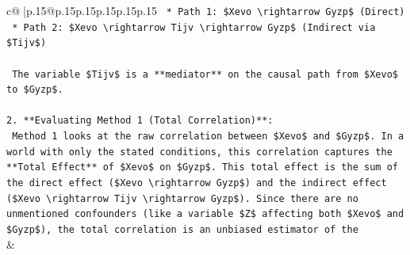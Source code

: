 \documentclass{article}
\begin{document}
{\begin{supertabular}{c@{$\;$}|p{.15\linewidth}@{}p{.15\linewidth}p{.15\linewidth}p{.15\linewidth}p{.15\linewidth}p{.15\linewidth}}
{{{\texttt{    *   Path 1: \$Xevo \textbackslash{}rightarrow Gyzp\$ (Direct)} \\
\texttt{    *   Path 2: \$Xevo \textbackslash{}rightarrow Tijv \textbackslash{}rightarrow Gyzp\$ (Indirect via \$Tijv\$)} \\
\\ 
\texttt{    The variable \$Tijv\$ is a **mediator** on the causal path from \$Xevo\$ to \$Gyzp\$.} \\
\\ 
\texttt{2.  **Evaluating Method 1 (Total Correlation)**:} \\
\texttt{    Method 1 looks at the raw correlation between \$Xevo\$ and \$Gyzp\$. In a world with only the stated conditions, this correlation captures the **Total Effect** of \$Xevo\$ on \$Gyzp\$. This total effect is the sum of the direct effect (\$Xevo \textbackslash{}rightarrow Gyzp\$) and the indirect effect (\$Xevo \textbackslash{}rightarrow Tijv \textbackslash{}rightarrow Gyzp\$). Since there are no unmentioned confounders (like a variable \$Z\$ affecting both \$Xevo\$ and \$Gyzp\$), the total correlation is an unbiased estimator of the} \\
            }
        }
    }
    & \\ \\


\end{supertabular}}
\end{document}
